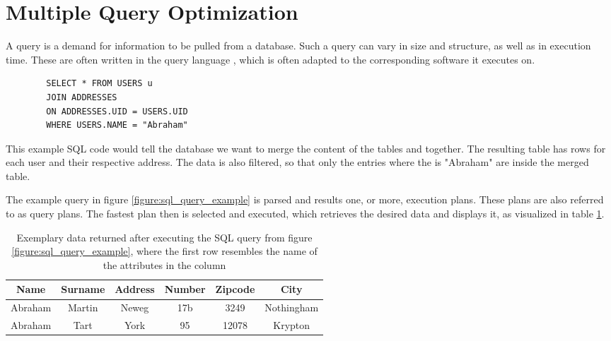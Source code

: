 \section{Multiple Query Optimization}
\label{chapter:fundamental_multiple_query_optimization}

A query\cite{codd_relational_1970} is a demand for information to be pulled from a database. Such a query can vary in size and structure, as well as in execution time. These are often written in the query language , which is often adapted to the corresponding software\cite{shirgoldbird_microsoft_nodate}\cite{the_postgresql_global_development_group_postgresql_2022} it executes on. 

    
\begin{listing}[!ht]
    \centering
    \begin{verbatim}
        SELECT * FROM USERS u
        JOIN ADDRESSES
        ON ADDRESSES.UID = USERS.UID
        WHERE USERS.NAME = "Abraham"
    \end{verbatim}
    \caption{This example SQL code would tell the database we want to merge the content of the tables  and  together. The resulting table has rows for each user and their respective address. The data is also filtered, so that only the entries where the  is "Abraham" are inside the merged table.}
    \label{figure:sql_query_example}
\end{listing}

The example query in figure \ref{figure:sql_query_example} is parsed and results one, or more, execution plans\cite{microsoft_execution_nodate}. These plans are also referred to as query plans. The fastest plan then is selected and executed, which retrieves the desired data and displays it, as visualized in table \ref{table:sql_query_result_example}.

\begin{table}[!h]
    \centering
    \begin{tabular}{|c|c|c|c|c|c|}
        \hline
        Name    & Surname  & Address & Number & Zipcode & City\\ \hline
        Abraham & Martin   & Neweg & 17b & 3249 & Nothingham \\ \hline
        Abraham & Tart     & York & 95 & 12078 & Krypton    \\ \hline
    \end{tabular}
    \caption{Exemplary data returned after executing the SQL query from figure \ref{figure:sql_query_example}, where the first row resembles the name of the attributes in the column}
    \label{table:sql_query_result_example}
\end{table}

